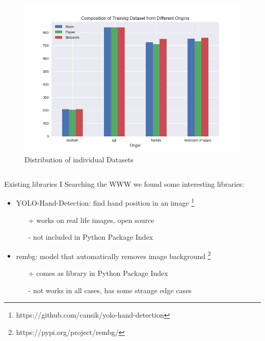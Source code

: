 \documentclass[aspectratio=169]{beamer}
\begin{document}
{\begin{frame}{}
\begin{columns}
	\begin{figure}
        \centering
        \includegraphics[width=\textwidth]{img/ds_analysis/train_ds.png}
        \caption{Distribution of individual Datasets}
    \end{figure} 
	\end{columns}
	\end{frame}
	
	
	\begin{frame}{Existing libraries I}
	Searching the WWW we found some interesting libraries:
	\begin{itemize}
		\item YOLO-Hand-Detection: find hand position in an image \footnote{https://github.com/cansik/yolo-hand-detection}
		\begin{itemize}
			\item[+] works on real life images, open source
			\item[-] not included in Python Package Index
		\end{itemize}
		\pause
		\item rembg: model that automatically removes image background \footnote{https://pypi.org/project/rembg/}
		\begin{itemize}
			\item[+] comes as library in Python Package Index 
			\item[-] not works in all cases, has some strange edge cases
		\end{itemize}
	\end{itemize}
	\end{frame}
	
}
\end{document}
